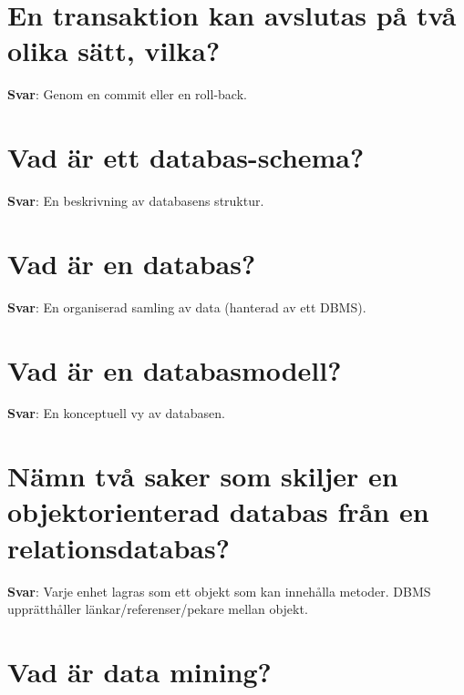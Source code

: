 \documentclass[a4paper,11pt,oneside]{book}
\begin{document}
\begin{sloppypar}
\section{En transaktion kan avslutas p\r{a} tv\r{a} olika s\"att, vilka?}

\label{q:287:sa:sv:True}

\textbf{Svar}: Genom en commit eller en roll-back.



\section{Vad \"ar ett databas-schema?}

\label{q:288:sa:sv:True}

\textbf{Svar}: En beskrivning av databasens struktur.



\section{Vad \"ar en databas?}

\label{q:289:sa:sv:True}

\textbf{Svar}: En organiserad samling av data (hanterad av ett DBMS).



\section{Vad \"ar en databasmodell?}

\label{q:290:sa:sv:True}

\textbf{Svar}: En konceptuell vy av databasen.



\section{N\"amn tv\r{a} saker som skiljer en objektorienterad databas fr\r{a}n en relationsdatabas?}

\label{q:291:sa:sv:True}

\textbf{Svar}: Varje enhet lagras som ett objekt som kan inneh\r{a}lla metoder. DBMS uppr\"atth\r{a}ller l\"ankar/referenser/pekare mellan objekt.



\section{Vad \"ar data mining?}


\end{sloppypar}
\end{document}
